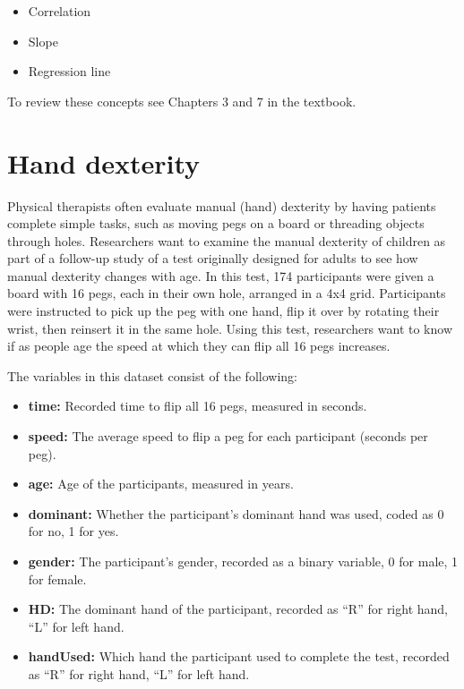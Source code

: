\documentclass[
]{report}
\begin{document}
\begin{itemize}
\item
  Correlation
\item
  Slope
\item
  Regression line
\end{itemize}

To review these concepts see Chapters 3 and 7 in the textbook.

\hypertarget{hand-dexterity-1}{%
\section{Hand dexterity}\label{hand-dexterity-1}}

Physical therapists often evaluate manual (hand) dexterity by having patients complete simple tasks, such as moving pegs on a board or threading objects through holes. Researchers want to examine the manual dexterity of children as part of a follow-up study of a test originally designed for adults to see how manual dexterity changes with age. In this test, 174 participants were given a board with 16 pegs, each in their own hole, arranged in a 4x4 grid. Participants were instructed to pick up the peg with one hand, flip it over by rotating their wrist, then reinsert it in the same hole. Using this test, researchers want to know if as people age the speed at which they can flip all 16 pegs increases.

The variables in this dataset consist of the following:

\begin{itemize}
\item
  \textbf{time:} Recorded time to flip all 16 pegs, measured in seconds.
\item
  \textbf{speed:} The average speed to flip a peg for each participant (seconds per peg).
\item
  \textbf{age:} Age of the participants, measured in years.
\item
  \textbf{dominant:} Whether the participant's dominant hand was used, coded as 0 for no, 1 for yes.
\item
  \textbf{gender:} The participant's gender, recorded as a binary variable, 0 for male, 1 for female.
\item
  \textbf{HD:} The dominant hand of the participant, recorded as ``R'' for right hand, ``L'' for left hand.
\item
  \textbf{handUsed:} Which hand the participant used to complete the test, recorded as ``R'' for right hand, ``L'' for left hand.
\end{itemize}
\end{document}
